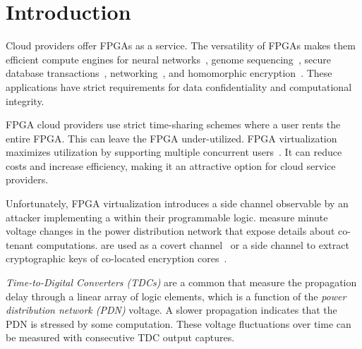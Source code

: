 
\section{Introduction}
Cloud providers offer FPGAs as a service. The versatility of FPGAs makes them efficient compute engines for neural networks~\cite{fowers2018configurable}, genome sequencing~\cite{chen2016spark}, secure database transactions~\cite{arasu2015transaction}, networking~\cite{putnam2014reconfigurable}, and homomorphic encryption~\cite{poppelmann2015accelerating}. These applications have strict requirements for data confidentiality and computational integrity. 



FPGA cloud providers use strict time-sharing schemes where a user rents the entire FPGA. This can leave the FPGA under-utilized. FPGA virtualization maximizes utilization by supporting multiple concurrent users~\cite{zha2020virtualizing}. It can reduce costs and increase efficiency, making it an attractive option for cloud service providers.

Unfortunately, FPGA virtualization introduces a side channel observable by an attacker implementing a \sensor within their programmable logic. \Sensors measure minute voltage changes in the power distribution network that expose details about co-tenant computations. \Sensors are used as a covert channel~\cite{zhao2018fpga, schellenberg2018remote} or a side channel to extract cryptographic keys of co-located encryption cores~\cite{zhao2018fpga, schellenberg2018remote}. 



\emph{Time-to-Digital Converters (TDCs)} are a common \sensor that measure the propagation delay through a linear array of logic elements, which is a function of the \emph{power distribution network (PDN)} voltage. A slower propagation indicates that the PDN is stressed by some computation. These voltage fluctuations over time can be measured with consecutive TDC output captures.



